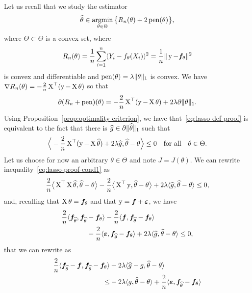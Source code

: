 Let us recall that we study the estimator
\begin{equation}
	\label{eq:lasso-def-proof}
	\widehat \theta \in \operatorname*{argmin}_{\theta \in \Theta} \big\{ R_n(\theta) + 2 \operatorname{pen}(\theta) \big\},
\end{equation}
where $\Theta \subset \Theta$ is a convex set, where 
\begin{equation*}
	R_n(\theta) = \frac 1n \sum_{i=1}^n (Y_i - f_\theta(X_i))^2	
	= \frac 1n \| \operatorname{{\boldsymbol y}} - {\boldsymbol f}_{\theta} \|^2
\end{equation*}
is convex and differentiable and $\operatorname{pen}(\theta) = \lambda \| \theta \|_1$ is convex.
We have $\nabla R_n(\theta) = - \frac 2n \operatorname{{\boldsymbol X}}^\top (\operatorname{{\boldsymbol y}} - \operatorname{{\boldsymbol X}} \theta)$ so that
\begin{equation*}
	\partial(R_n + \operatorname{pen})(\theta) = - \frac 2n \operatorname{{\boldsymbol X}}^\top (\operatorname{{\boldsymbol y}} - \operatorname{{\boldsymbol X}} \theta) + 2 \lambda 
	\partial \| \theta \|_1.
\end{equation*}
Using Proposition~\ref{prop:optimality-criterion}, we have that~\eqref{eq:lasso-def-proof} is equivalent to the fact that there is $\widehat g \in \partial \| \widehat \theta \|_1$ such that
\begin{equation}
	\label{eq:lasso-proof-cond1}
	\Big \langle - \frac 2n \operatorname{{\boldsymbol X}}^\top (\operatorname{{\boldsymbol y}} - \operatorname{{\boldsymbol X}} \widehat \theta) + 2 \lambda \widehat g, \widehat \theta - \theta \Big \rangle \leq 0 \quad \text{for all} \quad \theta \in \Theta.
\end{equation}
Let us choose for now an arbitrary $\theta \in \Theta$ and note $J = J(\theta)$.
We can rewrite inequality~\eqref{eq:lasso-proof-cond1} as
\begin{equation*}
	\frac 2n \big \langle  \operatorname{{\boldsymbol X}}^\top \operatorname{{\boldsymbol X}} \widehat \theta, \widehat \theta - \theta \big \rangle 
	- \frac 2n \big \langle \operatorname{{\boldsymbol X}}^\top \operatorname{{\boldsymbol y}}, \widehat \theta - \theta \big \rangle
	+ 2 \lambda \langle \widehat g, \widehat \theta - \theta \rangle \leq 0,
\end{equation*}
and, recalling that $\operatorname{{\boldsymbol X}} \theta = {\boldsymbol f}_\theta$ and that $\operatorname{{\boldsymbol y}} = {\boldsymbol f} + \operatorname{\boldsymbol \varepsilon}$, we have
\begin{align*}
	\frac 2n \langle {\boldsymbol f}_{\widehat \theta}, {\boldsymbol f}_{\widehat \theta} &- {\boldsymbol f}_{\theta} \rangle 
	- \frac 2n  \langle {\boldsymbol f},  {\boldsymbol f}_{\widehat \theta} - {\boldsymbol f}_\theta \rangle \\
	&- \frac 2n \langle \operatorname{\boldsymbol \varepsilon}, {\boldsymbol f}_{\widehat \theta} - {\boldsymbol f}_\theta \rangle
	+ 2 \lambda \langle \widehat g, \widehat \theta - \theta \rangle \leq 0,
\end{align*}
that we can rewrite as 
\begin{align*}
	\frac 2n \langle  {\boldsymbol f}_{\widehat \theta} - {\boldsymbol f}, {\boldsymbol f}_{\widehat \theta} - {\boldsymbol f}_{\theta} \rangle
	&+ 2 \lambda  \langle \widehat g - g, \widehat \theta - \theta \rangle \\
	\leq &- 2 \lambda  \langle g, \widehat \theta - \theta \rangle 
	+ \frac 2n  \langle \operatorname{\boldsymbol \varepsilon},  {\boldsymbol f}_{\widehat \theta} - {\boldsymbol f}_\theta \rangle 
\end{align*}
